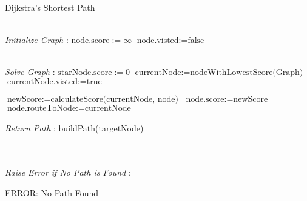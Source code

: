\label{Dijkstra}
\begin{algorithm}
  \caption{Dijkstra's Shortest Path}
  \begin{algorithmic}[1]
  \renewcommand{\algorithmicrequire}{\textbf{Input: Graph, startNode, targetNode}}
  \renewcommand{\algorithmicensure}{\textbf{Output: Path}}
  \\ \textit{Initialize Graph} :
   \STATE $\text{node.score} := \infty$
   \STATE $\text{node.visted} := \text{false}$
   \ENDFOR

   \\ \textit{Solve Graph} :
   \STATE $\text{starNode.score} := 0$
  \STATE $\text{currentNode} := \text{nodeWithLowestScore(Graph)}$
  \STATE $\text{currentNode.visted} := \text{true}$

    \STATE $\text{newScore} := \text{calculateScore(currentNode, node)}$
    \STATE  $\text{node.score} := \text{newScore}$
    \STATE  $\text{node.routeToNode} := \text{currentNode}$
    \ENDIF
    \ENDIF
    \ENDFOR
    \\
    \\ \textit{Return Path} :
    \RETURN build{Path(targetNode)}
    \ENDIF

    \\
    \\ \textit{Raise Error if No Path is Found} :

    \RETURN ERROR: No Path Found
    \ENDIF

   \ENDWHILE

  \end{algorithmic} 
  \end{algorithm}